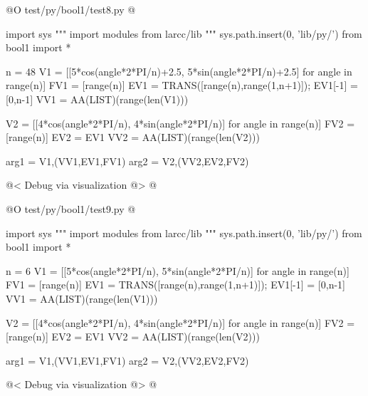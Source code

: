 \documentclass[11pt,oneside]{article}	%
\begin{document}
@O test/py/bool1/test8.py
@{
import sys
""" import modules from larcc/lib """
sys.path.insert(0, 'lib/py/')
from bool1 import *


n = 48
V1 = [[5*cos(angle*2*PI/n)+2.5, 5*sin(angle*2*PI/n)+2.5] for angle in range(n)]
FV1 = [range(n)]
EV1 = TRANS([range(n),range(1,n+1)]); EV1[-1] = [0,n-1]
VV1 = AA(LIST)(range(len(V1)))

V2 = [[4*cos(angle*2*PI/n), 4*sin(angle*2*PI/n)] for angle in range(n)]
FV2 = [range(n)]
EV2 = EV1
VV2 = AA(LIST)(range(len(V2)))

arg1 = V1,(VV1,EV1,FV1)
arg2 = V2,(VV2,EV2,FV2)

@< Debug via visualization @>
@}

@O test/py/bool1/test9.py
@{
import sys
""" import modules from larcc/lib """
sys.path.insert(0, 'lib/py/')
from bool1 import *

n = 6
V1 = [[5*cos(angle*2*PI/n), 5*sin(angle*2*PI/n)] for angle in range(n)]
FV1 = [range(n)]
EV1 = TRANS([range(n),range(1,n+1)]); EV1[-1] = [0,n-1]
VV1 = AA(LIST)(range(len(V1)))

V2 = [[4*cos(angle*2*PI/n), 4*sin(angle*2*PI/n)] for angle in range(n)]
FV2 = [range(n)]
EV2 = EV1
VV2 = AA(LIST)(range(len(V2)))

arg1 = V1,(VV1,EV1,FV1)
arg2 = V2,(VV2,EV2,FV2)

@< Debug via visualization @>
@}
\end{document}
